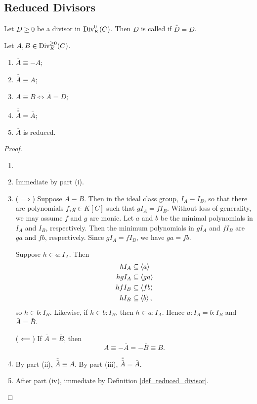 


\subsection{Reduced Divisors}

\begin{definition}
  \label{def_reduced_divisor}
  Let $D \geq 0$ be a divisor in $\operatorname{Div}_K^0(C)$.
  Then $D$ is called  if $\bar{\bar D} = D$.
\end{definition}

\begin{proposition}
  \label{prop_flip_properties}
  Let $A, B \in \operatorname{Div}_K^{\geq 0}(C)$.
  \begin{enumerate}[label=(\roman*)]
    \item $\bar A \equiv -A$;
    \item $\bar{\bar A} \equiv A$;
    \item $A \equiv B \iff \bar A = \bar D$;
    \item $\bar{\bar{\bar A}} = \bar A$;
    \item $\bar A$ is reduced.
  \end{enumerate}
\end{proposition}
\begin{proof}
  \begin{enumerate}[label=(\roman*)]
    \item 
    \item Immediate by part (i).
    \item
      ($\implies$)
      Suppose $A \equiv B$.
      Then in the ideal class group, $I_A \equiv I_B$,
      so that there are polynomials $f, g \in K[C]$ such that $gI_A = fI_B$.
      Without loss of generality, we may assume $f$ and $g$ are monic.
      Let $a$ and $b$ be the minimal polynomials in $I_A$ and $I_B$, respectively.
      Then the minimum polynomials in $gI_A$ and $fI_B$ are $ga$ and $fb$, respectively.
      Since $gI_A = fI_B$, we have $ga = fb$.
      
      Suppose $h \in a : I_A$. Then
      \begin{align*}
        hI_A &\subseteq \left\langle a \right\rangle \\
        hgI_A &\subseteq \left\langle ga \right\rangle \\
        hfI_B &\subseteq \left\langle fb \right\rangle \\
        hI_B &\subseteq \left\langle b \right\rangle,
      \end{align*}
      so $h \in b : I_B$.
      Likewise, if $h \in b : I_B$, then $h \in a : I_A$.
      Hence $a : I_A = b : I_B$ and $\bar A = \bar B$.
      
      ($\impliedby$)
      If $\bar A = \bar B$, then
      \[ A \equiv - \bar A = - \bar B \equiv B. \]
    \item By part (ii), $\bar{\bar A} \equiv A$.
          By part (iii), $\bar{\bar{\bar A}} = \bar A$.
    \item After part (iv), immediate by Definition \ref{def_reduced_divisor}.
  \end{enumerate}
\end{proof}

